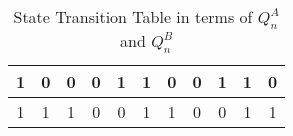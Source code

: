 \begin{table}[ht!]
\begin{tabular}{|cc||cccc||cccc||c|}
    1                                                    & 0                                                    & 0           & \multicolumn{1}{c|}{0}           & 1            & 1           & 0     & \multicolumn{1}{c|}{0}     & 1            & 1           & 0                                                                   \\ \hline
    1                                                    & 1                                                    & 1           & \multicolumn{1}{c|}{0}           & 0            & 1           & 1     & \multicolumn{1}{c|}{0}     & 0            & 1           & 1                                                                   \\ \hline
    \end{tabular}
    \caption{State Transition Table in terms of $Q^A_n$ and $Q^B_n$} \label{tab:state_transition_table_2}
    \end{table}\FloatBarrier

    